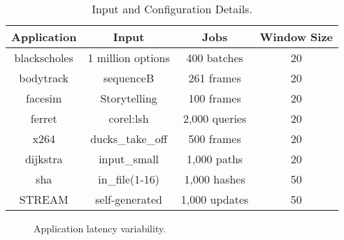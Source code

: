 \begin{table}[t]
\small
\centering
\caption{Input and Configuration Details.}
\begin{tabular}{cccc}
  \textbf{Application} & \textbf{Input} & \textbf{Jobs} & \textbf{Window Size} \\
  \hline
  \hline
  blackscholes   & 1 million options              & 400 batches   & 20 \\
  bodytrack      & sequenceB                      & 261 frames    & 20 \\
  facesim        & Storytelling                   & 100 frames    & 20 \\
  ferret         & corel:lsh                      & 2,000 queries & 20 \\
  x264           & ducks\_take\_off               & 500 frames    & 20 \\
  dijkstra       & input\_small                   & 1,000 paths   & 20 \\
  sha            & in\_file(1-16)                 & 1,000 hashes  & 50 \\
  STREAM         & self-generated                 & 1,000 updates & 50 \\
  \hline
  \hline
\end{tabular}
\label{tbl:poet-inputs}
\end{table}

\begin{figure}[t]
  \centering
  
  \caption{Application latency variability.}
  \label{fig:poet-variation}
\end{figure}
